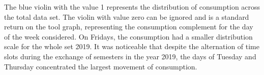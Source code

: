     	        The blue violin with the value 1 represents the distribution of consumption across the total data set.
    	        The violin with value zero can be ignored and is a standard return on the tool graph, representing the consumption complement for the day of the week considered.
    	        On Fridays, the consumption had a smaller distribution scale for the whole set 2019. It was noticeable that despite the alternation of time slots during the exchange of semesters in the year 2019, the days of Tuesday and Thursday concentrated the largest movement of consumption.
    	      { \begin{center}    
    	        \begin{minipage}[c]{0.45\textwidth}
    	         \begin{figure}[H]
                \end{figure}\end{minipage} \hfill %
                \begin{minipage}[c]{0.45\textwidth}
                \begin{figure}[H]

\end{figure}
\end{minipage}
\end{center}}
